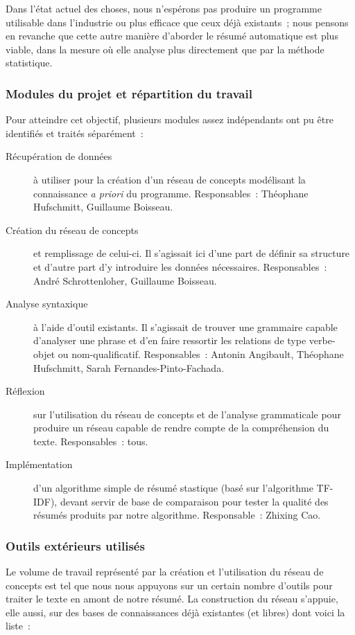 \documentclass[a4paper, 12pt]{article}
\begin{document}
Dans l'état actuel des choses, nous n'espérons pas produire un programme utilisable dans l'industrie ou plus efficace que ceux déjà existants~; nous pensons en revanche que cette autre manière d'aborder le résumé automatique est plus viable, dans la mesure où elle analyse plus directement que par la méthode statistique.

\subsubsection{Modules du projet et répartition du travail}
Pour atteindre cet objectif, plusieurs modules assez indépendants ont pu être identifiés et traités séparément~:

\begin{description}
	\item[Récupération de données] à utiliser pour la création d'un réseau de concepts modélisant la connaissance \textit{a priori} du programme. Responsables~: Théophane Hufschmitt, Guillaume Boisseau.
	\item[Création du réseau de concepts] et remplissage de celui-ci. Il s'agissait ici d'une part de définir sa structure et d'autre part d'y introduire les données nécessaires. Responsables~: André Schrottenloher, Guillaume Boisseau.
	\item[Analyse syntaxique] à l'aide d'outil existants. Il s'agissait de trouver une grammaire capable d'analyser une phrase et d'en faire ressortir les relations de type verbe-objet ou nom-qualificatif. Responsables~: Antonin Angibault, Théophane Hufschmitt, Sarah Fernandes-Pinto-Fachada.
	\item[Réflexion] sur l'utilisation du réseau de concepts et de l'analyse grammaticale pour produire un réseau capable de rendre compte de la compréhension du texte. Responsables~: tous.
	\item[Implémentation] d'un algorithme simple de résumé stastique (basé sur l'algorithme TF-IDF), devant servir de base de comparaison pour tester la qualité des résumés produits par notre algorithme.  Responsable~: Zhixing Cao.
\end{description}

\subsubsection{Outils extérieurs utilisés}

Le volume de travail représenté par la création et l'utilisation du réseau de concepts est tel que nous nous appuyons sur un certain nombre d'outils pour traiter le texte en amont de notre résumé. La construction du réseau s'appuie, elle aussi, sur des bases de connaissances déjà existantes (et libres) dont voici la liste~:
\end{document}
